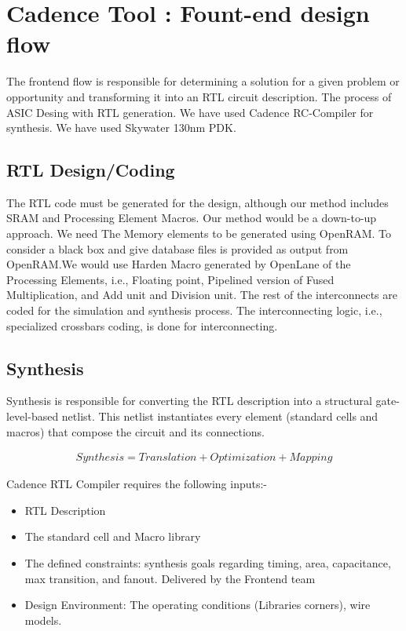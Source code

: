 \section{Cadence Tool : Fount-end design flow}
The frontend flow is responsible for determining a solution for a given problem or opportunity and transforming it into an RTL circuit description. The process of ASIC Desing with RTL generation. We have used Cadence RC-Compiler for synthesis. We have used Skywater 130nm PDK.

\subsection{RTL Design/Coding}
The RTL code must be generated for the design, although our method includes SRAM and Processing Element Macros. Our method would be a down-to-up approach. We need The Memory elements to be generated using OpenRAM. To consider a black box and give database files is provided as output from OpenRAM.We would use Harden Macro generated by OpenLane of the Processing Elements, i.e., Floating point, Pipelined version of Fused Multiplication, and Add unit and Division unit. The rest of the interconnects are coded for the simulation and synthesis process. The interconnecting logic, i.e., specialized crossbars coding, is done for interconnecting. 

\subsection{Synthesis}
Synthesis is responsible for converting the RTL description into a structural gate-level-based netlist. This netlist instantiates every element (standard cells and macros) that compose the circuit and its connections.

\begin{align*}
Synthesis = Translation + Optimization + Mapping
\end{align*}

Cadence RTL Compiler requires the following inputs:-
\begin{itemize}
  \itemsep0em
  \item RTL Description
  \item The standard cell and Macro library
  \item The defined constraints: synthesis goals regarding timing, area, capacitance, max transition, and fanout. Delivered by the Frontend team
  \item Design Environment: The operating conditions (Libraries corners), wire models.
\end{itemize}


